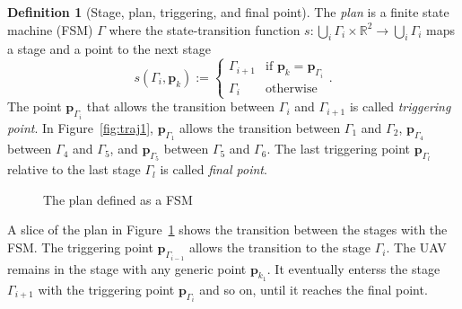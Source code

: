 \documentclass[letterpaper,10pt,conference]{ieeeconf}
\theoremstyle{definition}
\newtheorem{defn}{Definition}[section]
\begin{document}
\begin{defn}[Stage, plan, triggering, and final point]
  The \emph{plan} is a finite state machine (FSM) $\Gamma$ where the state-transition function $s:\bigcup_i{\Gamma_i}\times\mathbb{R}^2\rightarrow\bigcup_i{\Gamma_i}$ maps a stage and a point to the next stage
  \begin{equation*}s(\Gamma_i,\mathbf{p}_k):=\begin{cases}
    \Gamma_{i+1} & \text{if }\mathbf{p}_k=\mathbf{p}_{\Gamma_i}\\
    \Gamma_i & \text{otherwise}
  \end{cases}.\end{equation*}
  The point $\mathbf{p}_{\Gamma_{i}}$ that allows the transition between $\Gamma_i$ and $\Gamma_{i+1}$ is called \emph{triggering point}. In Figure~\ref{fig:traj1}, $\mathbf{p}_{\Gamma_1}$ allows the transition between $\Gamma_1$ and $\Gamma_2$, $\mathbf{p}_{\Gamma_4}$ between $\Gamma_4$ and $\Gamma_5$, and $\mathbf{p}_{\Gamma_5}$ between $\Gamma_5$ and $\Gamma_6$. The last triggering point $\mathbf{p}_{\Gamma_{l}}$ relative to the last stage $\Gamma_l$ is called \emph{final point}.
\end{defn}

\begin{figure}[h]
  \center
  \caption{The plan defined as a FSM}
  \label{fig:state-machine}
\end{figure}

A slice of the plan in Figure~\ref{fig:state-machine} shows the transition between the stages with the FSM. The triggering point $\mathbf{p}_{\Gamma_{i-1}}$ allows the transition to the stage $\Gamma_i$. The UAV remains in the stage with any generic point $\mathbf{p}_{k_1}$. It eventually enterss the stage $\Gamma_{i+1}$ with the triggering point $\mathbf{p}_{\Gamma_i}$ and so on, until it reaches the final point.
\end{document}
